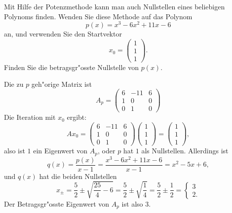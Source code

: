 Mit Hilfe der Potenzmethode kann man auch Nullstellen eines beliebigen
Polynoms finden. Wenden Sie diese Methode auf das Polynom
\[
p(x)=x^3-6x^2+11x-6
\]
an, und verwenden Sie den Startvektor
\[
x_0=\begin{pmatrix}1\\1\\1\end{pmatrix}.
\]
Finden Sie die betragsgr"osste Nullstelle von $p(x)$.

\begin{loesung}
Die zu $p$ geh"orige Matrix ist
\[
A_p
=
\begin{pmatrix}
6&-11&6\\
1&  0&0\\
0&  1&0
\end{pmatrix}
\]
Die Iteration mit $x_0$ ergibt:
\[
Ax_0=
\begin{pmatrix}
6&-11&6\\
1&  0&0\\
0&  1&0
\end{pmatrix}
\begin{pmatrix}1\\1\\1\end{pmatrix}
=
\begin{pmatrix}
1\\1\\1
\end{pmatrix},
\]
also ist $1$ ein Eigenwert von $A_p$, oder $p$ hat $1$ als Nullstellen.
Allerdings ist
\[
q(x)=\frac{p(x)}{x-1}=\frac{x^3-6x^2+11x-6}{x-1}
=x^2-5x+6,
\]
und $q(x)$ hat die beiden Nullstellen
\[
x_\pm=\frac52\pm\sqrt{\frac{25}4-6}
=\frac52\pm\sqrt{\frac14}=\frac52\pm\frac12=\begin{cases}3\\2.\end{cases}
\]
Der Betragsgr"osste Eigenwert von $A_p$ ist also 3.


\end{loesung}
